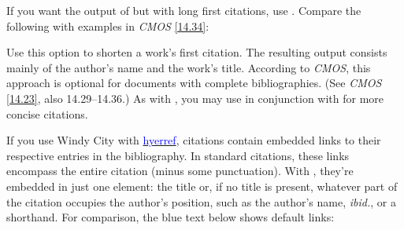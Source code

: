 \documentclass[11pt,letterpaper,oneside]{article}
\begin{document}
\begin{optionlist}
\noindent If you want the output of  but with long first
citations, use . Compare the following with examples
in \textit{CMOS} \ref{14.34}:


\begin{citeonly}
\item \cite[3]{morrison2004a}
\item \cite[18]{morrison2004a}
\item \cite[18]{morrison2004a}
\item \cite[24--26]{morrison2004a}
\item \cite[401-2]{morrison2004b}
\item \cite[433]{morrison2004b}
\item \cite[37--38]{diaz2008}
\item \cite[403]{morrison2004b}
\item \cite[152]{diaz2008}
\item \cite[201-2]{diaz2008}
\item \cites[240]{morrison2004b}[32]{morrison2004a}
\item \cite[33]{morrison2004a}
\end{citeonly}


\noindent Use this option to shorten a work's first citation. The
resulting output consists mainly of the author's name and the work's
title. According to \textit{CMOS}, this approach is optional for
documents with complete bibliographies. (See \textit{CMOS}
\ref{14.23}, also 14.29--14.36.) As with , you may use
 in conjunction with  for more concise
citations.


\noindent If you use Windy City with
\href{http://www.ctan.org/pkg/hyperref}{\textcolor{blue}{hyerref}},
citations contain embedded links to their respective entries in the
bibliography. In standard citations, these links encompass the entire
citation (minus some punctuation). With , they're
embedded in just one element: the title or, if no title is present,
whatever part of the citation occupies the author's position, such as
the author's name, \textit{ibid.}, or a shorthand. For comparison, the
blue text below shows default links:


\end{optionlist}
\end{document}
